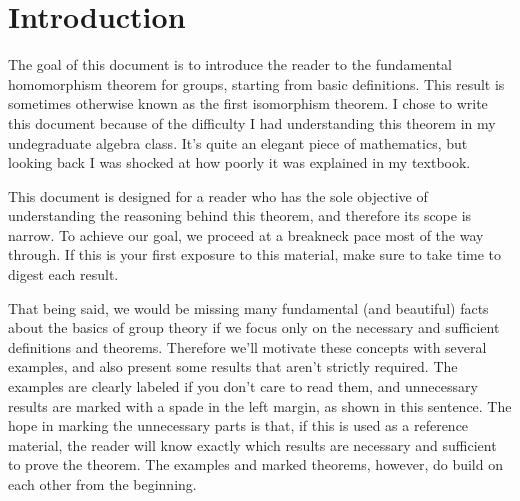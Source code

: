 \section*{Introduction}
\markright{}

The goal of this document is to introduce the reader to the fundamental homomorphism theorem for groups, starting from basic definitions. This result is sometimes otherwise known as the first isomorphism theorem. I chose to write this document because of the difficulty I had understanding this theorem in my undegraduate algebra class. It's quite an elegant piece of mathematics, but looking back I was shocked at how poorly it was explained in my textbook.

This document is designed for a reader who has the sole objective of understanding the reasoning behind this theorem, and therefore its scope is narrow. To achieve our goal, we proceed at a breakneck pace most of the way through. If this is your first exposure to this material, make sure to take time to digest each result.

That being said, we would be missing many fundamental (and beautiful) facts about the basics of  group theory if we focus only on the necessary and sufficient definitions and theorems. Therefore we'll motivate these concepts with several examples, and also present some results that aren't strictly required. \extra The examples are clearly labeled if you don't care to read them, and unnecessary results are marked with a spade in the left margin, as shown in this sentence. The hope in marking the unnecessary parts is that, if this is used as a reference material, the reader will know exactly which results are necessary and sufficient to prove the theorem. The examples and marked theorems, however, do build on each other from the beginning.